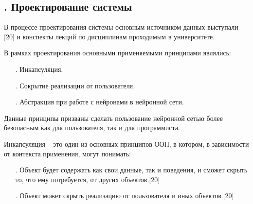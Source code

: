 \subtitlespace

\subsection*{
	\gostTitleFont
	\redline
	\thechaptercntr .\thesubchaptercntr \spc
	Проектирование системы 
} \addtocounter{subchaptercntr}{1}

\subtitlespace

{\gostFont

\par \redline В процессе проектирования системы основным источником данных выступали [20] и конспекты лекций по дисциплинам проходимым в университете. 

\par \redline В рамках проектирования основными применяемыми принципами являлись:

 \begin{itemize}[leftmargin=2.15cm, labelwidth=0.65cm, labelsep=0.0cm] 
 	
 	\item[\theitemcntr. ] Инкапсуляция.
 	\addtocounter{itemcntr}{1}
 	
 	\item[\theitemcntr. ] Сокрытие реализации от пользователя.
 	\addtocounter{itemcntr}{1}
 	
 	\item[\theitemcntr. ] Абстракция при работе с нейронами в нейронной сети.
 	\addtocounter{itemcntr}{1}
 	
 	\setcounter{itemcntr}{1}
 \end{itemize}

\par \redline Данные принципы призваны сделать пользование нейронной сетью более безопасным как для пользователя, так и для программиста.

\par \redline Инкапсуляция {--} это один из основных принципов ООП, в котором, в зависимости от контекста применения, могут понимать:

\begin{itemize}[leftmargin=2.15cm, labelwidth=0.65cm, labelsep=0.0cm] 
	
	\item[\theitemcntr. ]  Объект будет содержать как свои данные, так и поведения, и сможет скрыть то, что ему потребуется, от других объектов.[20]
	\addtocounter{itemcntr}{1}
	
	\item[\theitemcntr. ] Объект может скрыть реализацию от пользователя и иных объектов.[20]
	\addtocounter{itemcntr}{1}
	

\end{itemize}}
